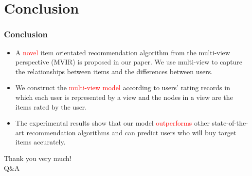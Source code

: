 \documentclass{beamer}
\newcommand{\red}[1]{\textcolor{red}{#1}}%
\begin{document}
\section{Conclusion}
\begin{frame}
\frametitle{Conclusion}
\begin{itemize}
\item<2-> A \red{novel} item orientated recommendation algorithm from the multi-view perspective (MVIR) is proposed in our paper. We use multi-view to capture the relationships between items and the differences between users.%
\vskip 0.2in
\item<3-> We construct the \red{multi-view model} according to users' rating records in which each user is represented by a view and the nodes in a view are the items rated by the user.%
\vskip 0.2in
\item<4-> The experimental results show that our model \red{outperforms} other state-of-the-art recommendation algorithms and can predict users who will buy target items accurately.
\end{itemize}
\end{frame}


\begin{frame}
\begin{center}
\Huge Thank you very much!\\
Q\&A
\end{center}
\end{frame}
\end{document}
